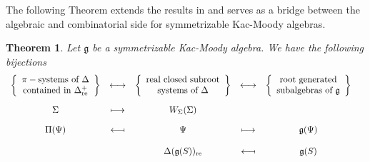 \documentclass[12pt,reqno]{amsart}
\theoremstyle{plain}
\newtheorem*{thm}{Theorem}
\theoremstyle{definition}
\theoremstyle{remark}
\newcommand{\lie}[1]{\mathfrak{#1}}
\begin{document}
The following Theorem extends the results in \cite{dynkin1952semisimple,roy2019maximal} and serves as a bridge between the algebraic and combinatorial side for symmetrizable Kac-Moody algebras. 

\begin{thm}\label{mainresbij}\cite{habib2023root}
     Let $\lie g$ be a symmetrizable Kac-Moody algebra.
     We have the following bijections \vspace{10pt}
    $$\begin{array}{cccccr}
     \vspace{10pt}\left\{\begin{array}{c}
            \pi-\text{systems of }\Delta  \\
             \text{contained in } \Delta^+_{\mathrm{re}}
       \end{array}\right\}  & \longleftrightarrow & \left\{\begin{array}{c}
            \text{real closed subroot}  \\
             \text{systems of } \Delta
       \end{array}\right\}& \longleftrightarrow & \left\{\begin{array}{c}
            \text{root generated}\\
             \text{subalgebras of $\lie g$} 
       \end{array}\right\} \\ \vspace{10pt}
        \Sigma  & \longmapsto & W_\Sigma(\Sigma)\\
    \Pi(\Psi) & \longmapsfrom &\Psi & \longmapsto& \lie g(\Psi)&\\ \\
    &&\Delta(\lie g(S))_{\mathrm{re}}& \longmapsfrom &\lie g(S)&
    \end{array}$$
    \end{thm}
    
\end{document}
